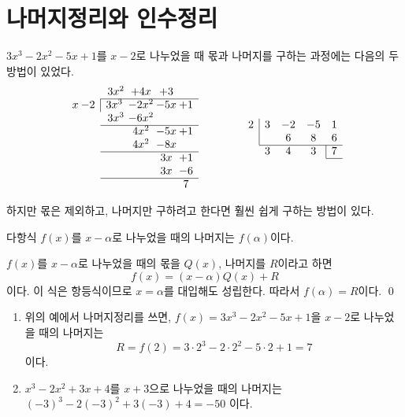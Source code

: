 \documentclass{oblivoir}
\begin{document}
\section{나머지정리와 인수정리}
\(3x^3-2x^2-5x+1\)를 \(x-2\)로 나누었을 때 몫과 나머지를 구하는 과정에는 다음의 두 방법이 있었다.
\begin{equation*}
\begin{array}{c@{\:}cc@{\:}c@{\:}c@{\:}c}
&&3x^2&+4x&+3\\
\cline{3-6}
x&-2	&\multicolumn{1}{|c}{3x^3}	&-2x^2&-5x&+1\\
&							&3x^3		&-6x^2\\
\cline{3-6}
&							&			&4x^2	&-5x	&+1\\
&							&			&4x^2	&-8x	&\\
\cline{3-6}
&							&			&		&3x		&+1\\
&							&			&		&3x 	&-6\\
\cline{3-6}
&							&			&		&	 	&7
\end{array}
\qquad\qquad
\begin{array}{ccccc}
\multicolumn{1}{c|}{2}	&3	&-2	&-5	&1\\
\multicolumn{1}{c|}{}		&	&6	&8	&6\\
\cline{2-5}
							&3	&4	&3	&\multicolumn1{|c}{7}\\
\cline{5-5}
\end{array}
\end{equation*}

하지만 몫은 제외하고, 나머지만 구하려고 한다면 훨씬 쉽게 구하는 방법이 있다.

\begin{mdframed}
%
다항식 \(f(x)\)를 \(x-\alpha\)로 나누었을 때의 나머지는 \(f(\alpha)\)이다.
\end{mdframed}

%
\proo{}
\(f(x)\)를 \(x-\alpha\)로 나누었을 때의 몫을 \(Q(x)\), 나머지를 \(R\)이라고 하면
\[f(x)=(x-\alpha)Q(x)+R\]
이다.
이 식은 항등식이므로 \(x=\alpha\)를 대입해도 성립한다.
따라서 \(f(\alpha)=R\)이다.
\qed

\clearpage
%
\exam{}
\begin{enumerate}[(1)]
\item
위의 예에서 나머지정리를 쓰면, \(f(x)=3x^3-2x^2-5x+1\)을 \(x-2\)로 나누었을 때의 나머지는
\[R=f(2)=3\cdot2^3-2\cdot2^2-5\cdot2+1=7\]
이다.
\item
\(x^3-2x^2+3x+4\)를 \(x+3\)으로 나누었을 때의 나머지는
\((-3)^3-2(-3)^2+3(-3)+4=-50\)
이다.
\end{enumerate}
\end{document}
